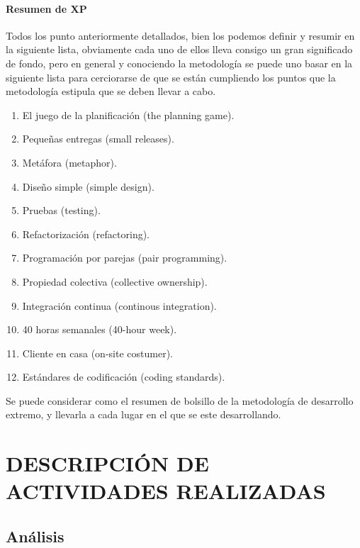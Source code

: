 \documentclass[12pt]{book} %
\begin{document}
		\subsubsection{Resumen de XP}
			Todos los punto anteriormente detallados, bien los podemos definir y resumir en la siguiente lista, obviamente cada uno de 
			ellos lleva consigo un gran significado de fondo, pero en general  y conociendo la metodología se puede uno basar en la
			siguiente lista para cerciorarse de que se están cumpliendo los puntos que la metodología estipula que se deben llevar a cabo.
			\begin{multicols}{2}
				\begin{enumerate}
					\item El juego de la planificación (the planning game).
					\item Pequeñas entregas (small releases).
					\item Metáfora (metaphor).
					\item Diseño simple (simple design).
					\item Pruebas (testing).
					\item Refactorización (refactoring).
					\item Programación por parejas (pair programming).
					\item Propiedad colectiva (collective ownership).
					\item Integración continua (continous integration).
					\item 40 horas semanales (40-hour week).
					\item Cliente en casa (on-site costumer).
					\item Estándares de codificación (coding standards).
				\end{enumerate}
			\end{multicols}
			
			Se puede considerar como el resumen de bolsillo de la metodología de desarrollo extremo, y llevarla a cada lugar en el que se este desarrollando.


\chapter{DESCRIPCIÓN DE ACTIVIDADES REALIZADAS}
\thispagestyle{empty}
\newpage
\section{Análisis}
\end{document}
